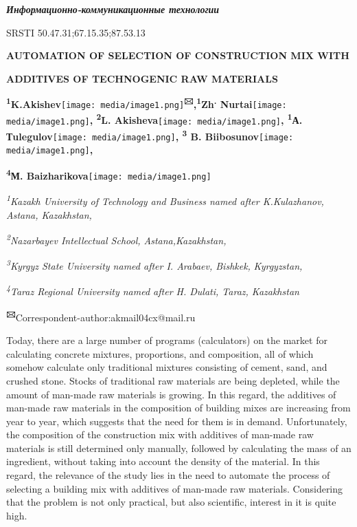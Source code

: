 \documentclass[
]{article}
\author{}
\date{}
\begin{document}
\emph{\textbf{Информационно-коммуникационные технологии}}

SRSTI 50.47.31;67.15.35;87.53.13

\textbf{AUTOMATION OF SELECTION OF CONSTRUCTION MIX WITH}

\textbf{ADDITIVES OF TECHNOGENIC RAW MATERIALS}

\textbf{\textsuperscript{1}K.Akishev}\texttt{[image: media/image1.png]}\textbf{\textsuperscript{🖂},\textsuperscript{1}Zh\textsuperscript{.}
Nurtai}\texttt{[image: media/image1.png]}\textbf{,
\textsuperscript{2}L.
Akisheva}\texttt{[image: media/image1.png]}\textbf{,
\textsuperscript{1}А.
Тulegulov}\texttt{[image: media/image1.png]}\textbf{,
\textsuperscript{3} B.
Biibosunov}\texttt{[image: media/image1.png]}\textbf{,}

\textbf{\textsuperscript{4}М.
Baizharikova}\texttt{[image: media/image1.png]}

\emph{\textsuperscript{1}Kazakh University of Technology and Business
named after K.Kulazhanov, Astana, Kazakhstan,}

\emph{\textsuperscript{2}Nazarbayev Intellectual School,
Astana,Kazakhstan,}

\emph{\textsuperscript{3}Kyrgyz State University named after I. Arabaev,
Bishkek,} \emph{Kyrgyzstan,}

\emph{\textsuperscript{4}Taraz Regional University named after H.
Dulati, Taraz, Kazakhstan}

\textbf{\textsuperscript{🖂}}Correspondent-author:akmail04cx@mail.ru

Today, there are a large number of programs (calculators) on the market
for calculating concrete mixtures, proportions, and composition, all of
which somehow calculate only traditional mixtures consisting of cement,
sand, and crushed stone. Stocks of traditional raw materials are being
depleted, while the amount of man-made raw materials is growing. In this
regard, the additives of man-made raw materials in the composition of
building mixes are increasing from year to year, which suggests that the
need for them is in demand. Unfortunately, the composition of the
construction mix with additives of man-made raw materials is still
determined only manually, followed by calculating the mass of an
ingredient, without taking into account the density of the material. In
this regard, the relevance of the study lies in the need to automate the
process of selecting a building mix with additives of man-made raw
materials. Considering that the problem is not only practical, but also
scientific, interest in it is quite high.
\end{document}
